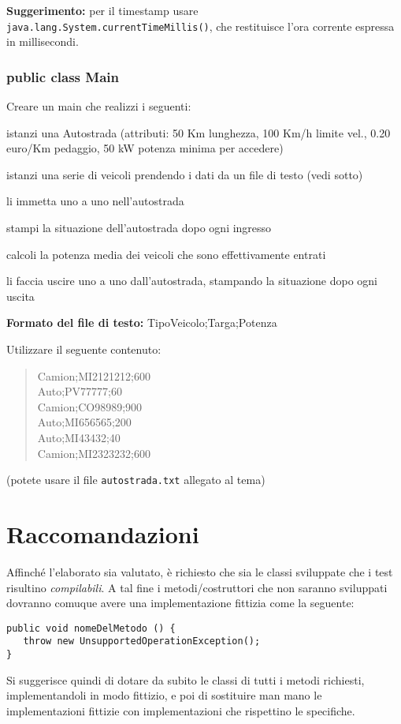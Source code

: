 \documentclass[a4paper,12pt]{article}
\begin{document}
\textbf{Suggerimento:} per il timestamp usare \texttt{java.lang.System.currentTimeMillis()},
che restituisce l'ora corrente espressa in millisecondi.

\subsubsection{public class Main}


Creare un main che realizzi i seguenti:

\begin{compactenum}
\item istanzi una Autostrada (attributi: 50 Km lunghezza, 100 Km/h 
limite vel., 0.20 euro/Km pedaggio, 50 kW potenza minima per accedere)
\item istanzi una serie di veicoli prendendo i dati da un file di testo (vedi 
sotto)
\item li immetta uno a uno nell'autostrada
\item stampi la situazione dell'autostrada dopo ogni ingresso
\item calcoli la potenza media dei veicoli che sono effettivamente entrati
\item li faccia uscire uno a uno dall'autostrada, stampando la situazione
dopo ogni uscita
\end{compactenum}

\textbf{Formato del file di testo:}  TipoVeicolo;Targa;Potenza

Utilizzare il seguente contenuto:

\begin{quote}
Camion;MI2121212;600\\
Auto;PV77777;60\\
Camion;CO98989;900\\
Auto;MI656565;200\\
Auto;MI43432;40\\
Camion;MI2323232;600\\
\end{quote}

(potete usare il file \texttt{autostrada.txt} allegato al tema)

\hrulefill
\section{Raccomandazioni}

Affinché l'elaborato sia valutato, è richiesto che sia le classi sviluppate che i test risultino
\textit{compilabili}. A tal fine i metodi/costruttori che non saranno sviluppati dovranno comuque avere
una implementazione fittizia come la seguente:
\begin{verbatim}
public void nomeDelMetodo () {
   throw new UnsupportedOperationException();
}
\end{verbatim}
Si suggerisce quindi di dotare da subito le classi di tutti i metodi richiesti, 
implementandoli in modo fittizio, e poi di sostituire man mano le 
implementazioni fittizie con implementazioni che rispettino le specifiche.
\end{document}
